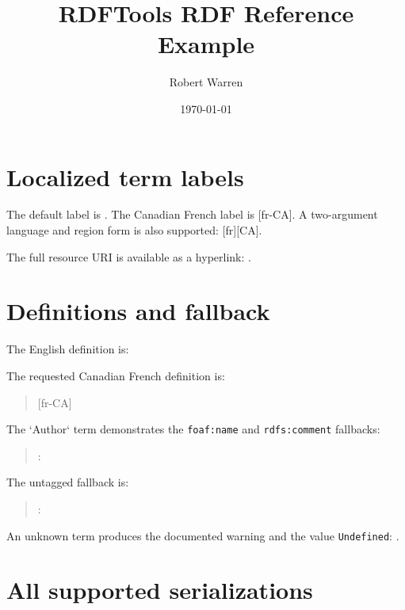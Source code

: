 \documentclass[11pt,letterpaper]{article}
\title{RDFTools RDF Reference Example}
\author{Robert Warren}
\date{\today}
\begin{document}
\makeRDFIndex

\clearpage
{}
\maketitle

\section{Localized term labels}

The default label is . The Canadian French label
is [fr-CA]. A two-argument language and region form
is also supported: [fr][CA].

The full resource URI is available as a hyperlink:
.

\section{Definitions and fallback}

The English definition is:

\begin{quote}
\end{quote}

The requested Canadian French definition is:

\begin{quote}
[fr-CA]
\end{quote}

The `Author` term demonstrates the \texttt{foaf:name} and
\texttt{rdfs:comment} fallbacks:

\begin{quote}
: 
\end{quote}

The untagged fallback is:

\begin{quote}
: 
\end{quote}

An unknown term produces the documented warning and the value
\texttt{Undefined}: .

\section{All supported serializations}
\end{document}
